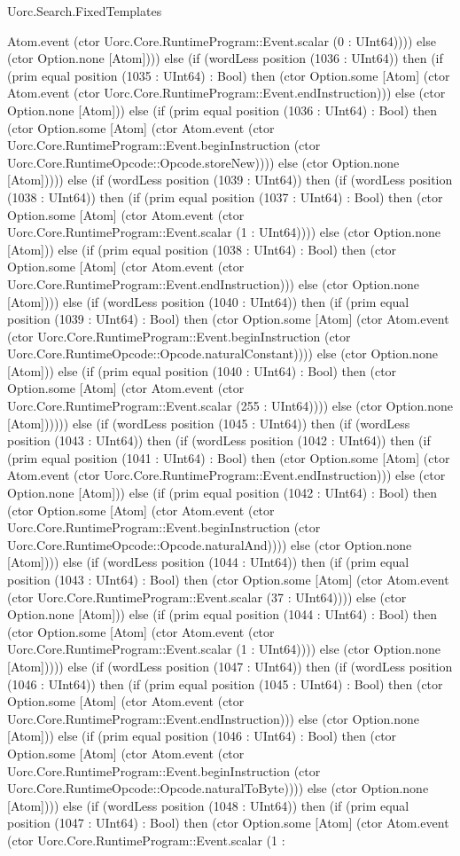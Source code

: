 \begin{lexlean}{Uorc.Search.FixedTemplates}
\begin{semanticmodule}
{Atom.event (ctor Uorc.Core.RuntimeProgram::Event.scalar (0 : UInt64)))) else (ctor Option.none [Atom]))) else (if (wordLess position (1036 : UInt64)) then (if (prim equal position (1035 : UInt64) : Bool) then (ctor Option.some [Atom] (ctor Atom.event (ctor Uorc.Core.RuntimeProgram::Event.endInstruction))) else (ctor Option.none [Atom])) else (if (prim equal position (1036 : UInt64) : Bool) then (ctor Option.some [Atom] (ctor Atom.event (ctor Uorc.Core.RuntimeProgram::Event.beginInstruction (ctor Uorc.Core.RuntimeOpcode::Opcode.storeNew)))) else (ctor Option.none [Atom])))) else (if (wordLess position (1039 : UInt64)) then (if (wordLess position (1038 : UInt64)) then (if (prim equal position (1037 : UInt64) : Bool) then (ctor Option.some [Atom] (ctor Atom.event (ctor Uorc.Core.RuntimeProgram::Event.scalar (1 : UInt64)))) else (ctor Option.none [Atom])) else (if (prim equal position (1038 : UInt64) : Bool) then (ctor Option.some [Atom] (ctor Atom.event (ctor Uorc.Core.RuntimeProgram::Event.endInstruction))) else (ctor Option.none [Atom]))) else (if (wordLess position (1040 : UInt64)) then (if (prim equal position (1039 : UInt64) : Bool) then (ctor Option.some [Atom] (ctor Atom.event (ctor Uorc.Core.RuntimeProgram::Event.beginInstruction (ctor Uorc.Core.RuntimeOpcode::Opcode.naturalConstant)))) else (ctor Option.none [Atom])) else (if (prim equal position (1040 : UInt64) : Bool) then (ctor Option.some [Atom] (ctor Atom.event (ctor Uorc.Core.RuntimeProgram::Event.scalar (255 : UInt64)))) else (ctor Option.none [Atom]))))) else (if (wordLess position (1045 : UInt64)) then (if (wordLess position (1043 : UInt64)) then (if (wordLess position (1042 : UInt64)) then (if (prim equal position (1041 : UInt64) : Bool) then (ctor Option.some [Atom] (ctor Atom.event (ctor Uorc.Core.RuntimeProgram::Event.endInstruction))) else (ctor Option.none [Atom])) else (if (prim equal position (1042 : UInt64) : Bool) then (ctor Option.some [Atom] (ctor Atom.event (ctor Uorc.Core.RuntimeProgram::Event.beginInstruction (ctor Uorc.Core.RuntimeOpcode::Opcode.naturalAnd)))) else (ctor Option.none [Atom]))) else (if (wordLess position (1044 : UInt64)) then (if (prim equal position (1043 : UInt64) : Bool) then (ctor Option.some [Atom] (ctor Atom.event (ctor Uorc.Core.RuntimeProgram::Event.scalar (37 : UInt64)))) else (ctor Option.none [Atom])) else (if (prim equal position (1044 : UInt64) : Bool) then (ctor Option.some [Atom] (ctor Atom.event (ctor Uorc.Core.RuntimeProgram::Event.scalar (1 : UInt64)))) else (ctor Option.none [Atom])))) else (if (wordLess position (1047 : UInt64)) then (if (wordLess position (1046 : UInt64)) then (if (prim equal position (1045 : UInt64) : Bool) then (ctor Option.some [Atom] (ctor Atom.event (ctor Uorc.Core.RuntimeProgram::Event.endInstruction))) else (ctor Option.none [Atom])) else (if (prim equal position (1046 : UInt64) : Bool) then (ctor Option.some [Atom] (ctor Atom.event (ctor Uorc.Core.RuntimeProgram::Event.beginInstruction (ctor Uorc.Core.RuntimeOpcode::Opcode.naturalToByte)))) else (ctor Option.none [Atom]))) else (if (wordLess position (1048 : UInt64)) then (if (prim equal position (1047 : UInt64) : Bool) then (ctor Option.some [Atom] (ctor Atom.event (ctor Uorc.Core.RuntimeProgram::Event.scalar (1 : }
\end{semanticmodule}
\end{lexlean}
